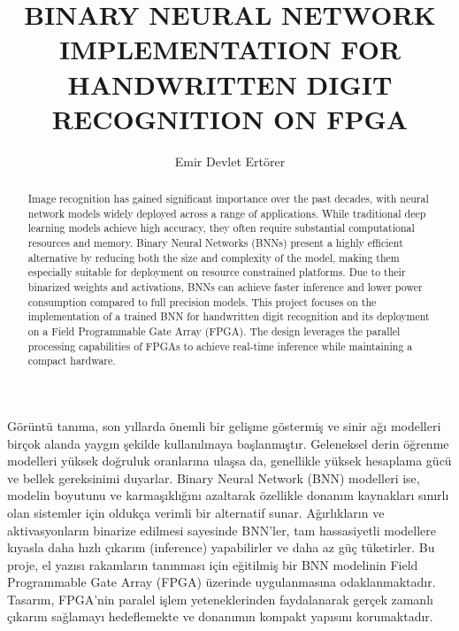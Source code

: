 \documentclass[a4paper,12pt]{report}
\title{BINARY NEURAL NETWORK IMPLEMENTATION FOR HANDWRITTEN DIGIT RECOGNITION ON FPGA}
\author{Emir Devlet Ertörer}
\begin{document}

\makecoverpage

\clearpage\mbox{}\clearpage\addtocounter{page}{-1}

\makeapprovalpage

\begin{acknowledgements}

\end{acknowledgements}

\begin{abstract}
Image recognition has gained significant importance over the past decades, with neural network models widely deployed across a range of applications. While traditional deep learning models achieve high accuracy, they often require substantial computational resources and memory. Binary Neural Networks (BNNs) present a highly efficient alternative by reducing both the size and complexity of the model, making them especially suitable for deployment on resource constrained platforms. Due to their binarized weights and activations, BNNs can achieve faster inference and lower power consumption compared to full precision models. This project focuses on the implementation of a trained BNN for handwritten digit recognition and its deployment on a Field Programmable Gate Array (FPGA). The design leverages the parallel processing capabilities of FPGAs to achieve real-time inference while maintaining a compact hardware. 

\end{abstract}

\begin{ozet}
Görüntü tanıma, son yıllarda önemli bir gelişme göstermiş ve sinir ağı modelleri birçok alanda yaygın şekilde kullanılmaya başlanmıştır. Geleneksel derin öğrenme modelleri yüksek doğruluk oranlarına ulaşsa da, genellikle yüksek hesaplama gücü ve bellek gereksinimi duyarlar. Binary Neural Network (BNN) modelleri ise, modelin boyutunu ve karmaşıklığını azaltarak özellikle donanım kaynakları sınırlı olan sistemler için oldukça verimli bir alternatif sunar. Ağırlıkların ve aktivasyonların binarize edilmesi sayesinde BNN’ler, tam hassasiyetli modellere kıyasla daha hızlı çıkarım (inference) yapabilirler ve daha az güç tüketirler. Bu proje, el yazısı rakamların tanınması için eğitilmiş bir BNN modelinin Field Programmable Gate Array (FPGA) üzerinde uygulanmasına odaklanmaktadır. Tasarım, FPGA’nin paralel işlem yeteneklerinden faydalanarak gerçek zamanlı çıkarım sağlamayı hedeflemekte ve donanımın kompakt yapısını korumaktadır.

\end{ozet}
\end{document}
